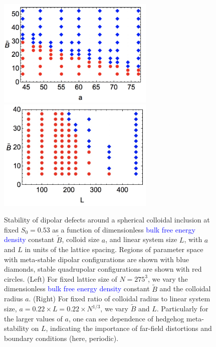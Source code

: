 \documentclass[utf8]{frontiersFPHY} %
\newcommand{\DAB}[1]{\textcolor{blue}{#1}}
\begin{document}
\begin{figure}[h!]
\begin{center}
\includegraphics[width=7.5cm]{Fig5Hedgehogs.jpg}\includegraphics[width=7.5cm]{Fig5BHedghogLatticeSizes.jpg}
\end{center}
\caption{Stability of dipolar defects around a spherical colloidal inclusion at fixed $S_0=0.53$ as a function of dimensionless \DAB{bulk free energy density} constant $\tilde{B}$, colloid size $a$, and linear system size $L$,  with $a$ and $L$ in units of the lattice spacing. Regions of parameter space with meta-stable dipolar configurations are shown with blue diamonds, stable quadrupolar configurations are shown with red circles. (Left) For fixed lattice size of $N=275^3$, we vary the dimensionless \DAB{bulk free energy density} constant $\tilde{B}$ and the colloidal radius $a$. (Right) For fixed ratio of colloidal radius to linear system size, $a=0.22\times L=0.22\times N^{1/3}$, we vary $\tilde{B}$ and $L$. Particularly for the larger values of $a$, one can see dependence of hedgehog meta-stability on $L$, indicating the importance of far-field distortions and boundary conditions (here, periodic). }  %
\label{fig:hedgehogStability} 
\end{figure}
\end{document}
